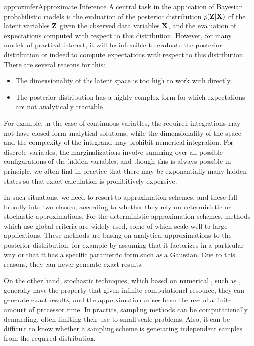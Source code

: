 \documentclass[9pt]{article}
\begin{document}
\begin{topic}{approxinfer}{Approximate Inference}
A central task in the application of Bayesian probabilistic models is the evaluation of the posterior distribution $p(\mathbf{Z}|\mathbf{X})$ of the latent variables $\mathbf{Z}$ given the observed data variables $\mathbf{X}$, and the evaluation of expectations computed with respect to this distribution. However, for many models of practical interest, it will be infeasible to evaluate the posterior distribution or indeed to compute expectations with respect to this distribution. There are several reasons for this:
\begin{itemize}
\item The dimensionality of the latent space is too high to work with directly
\item The posterior distribution has a highly complex form for which expectations are not analytically tractable
\end{itemize}
For example, in the case of continuous variables, the required integrations may not have closed-form analytical solutions, while the dimensionality of the space and the complexity of the integrand may prohibit numerical integration. For discrete variables, the marginalizations involve summing over all possible configurations of the hidden variables, and though this is always possible in principle, we often find in practice that there may be exponentially many hidden states so that exact calculation is prohibitively expensive.

In such situations, we need to resort to approximation schemes, and these fall broadly into two classes, according to whether they rely on deterministic or stochastic approximations. For the deterministic approximation schemes,  methods which use global criteria are widely used, some of which scale well to large applications. These methods are basing on analytical approximations to the posterior distribution, for example by assuming that it factorizes in a particular way or that it has a specific parametric form such as a Gaussian. Due to this reasons, they can never generate exact results.

On the other hand, stochastic techniques, which based on numerical , such as , generally have the property that given infinite computational resource, they can generate exact results, and the approximation arises from the use of a finite amount of processor time. In practice, sampling methods can be computationally demanding, often limiting their use to small-scale problems. Also, it can be difficult to know whether a sampling scheme is generating independent samples from the required distribution.
\end{topic}
\end{document}
